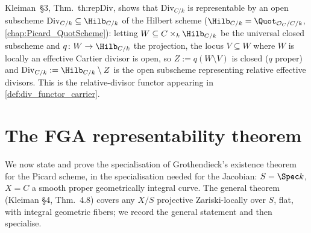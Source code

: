 \begin{remark}
  \label{rem:div_functor_representability}
  Kleiman~\S 3, Thm.~th:repDiv, shows that \(\mathrm{Div}_{C/k}\) is
  representable by an open subscheme \(\mathrm{Div}_{C/k} \subseteq
  \Hilb_{C/k}\) of the Hilbert scheme (\(\Hilb_{C/k} =
  \Quot_{\mathcal{O}_C/C/k}\), \cref{chap:Picard_QuotScheme}): letting
  \(W \subseteq C \times_k \Hilb_{C/k}\) be the universal closed
  subscheme and \(q \colon W \to \Hilb_{C/k}\) the projection, the locus
  \(V \subseteq W\) where \(W\) is locally an effective Cartier divisor
  is open, so \(Z := q(W \setminus V)\) is closed (\(q\) proper) and
  \(\mathrm{Div}_{C/k} := \Hilb_{C/k} \setminus Z\) is the open
  subscheme representing relative effective divisors. This is
  the relative-divisor functor appearing in
  \cref{def:div_functor_carrier}.
\end{remark}

\section{The FGA representability theorem}
\label{sec:fga_pic_representability}

We now state and prove the specialisation of Grothendieck's existence theorem
for the Picard scheme, in the specialisation needed for the Jacobian:
\(S = \Spec k\), \(X = C\) a smooth proper geometrically integral
curve. The general theorem (Kleiman \S 4, Thm.~4.8) covers any
\(X/S\) projective Zariski-locally over \(S\), flat, with integral geometric
fibers; we record the general statement and then specialise.

